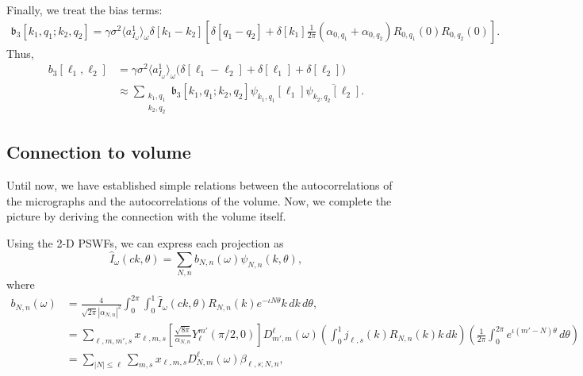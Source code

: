 \documentclass[12pt]{article}
\newcommand{\1}{\mathbf{1}}
\newcommand{\mk}{\mathfrak}
\newcommand*\Bell{\ensuremath{\boldsymbol\ell}}
\newcommand{\tamir}{x}
\theoremstyle{plain}
\theoremstyle{definition}
\theoremstyle{remark}
\theoremstyle{plain}
\theoremstyle{remark}
\theoremstyle{plain}
\theoremstyle{plain}
\begin{document}
Finally, we treat the bias terms:
\begin{align*}
\mk b_3[k_1,q_1; k_2,q_2] = \gamma\sigma^2\langle a^1_{I_{\omega}} \rangle_\omega \delta[k_1 - k_2]\left[\delta[q_1-q_2] + \delta[k_1]\frac{1}{2\pi}(\alpha_{0,q_1} + \alpha_{0,q_2})R_{0,q_1}(0)R_{0,q_2}(0)\right].
\end{align*}
%
Thus,
\begin{align*}
b_3[\Bell_1, \Bell_2] & = \gamma\sigma^2\langle a^1_{I_{\omega}}\rangle_{\omega}\Big(\delta[\Bell_1 - \Bell_2] +
\delta[\Bell_1] + \delta[\Bell_2]\Big) \\
& \approx \sum_{\substack{k_1, q_1\\ k_2, q_2}} \mk 
b_3[k_1,q_1; k_2, q_2]\psi_{k_1,q_1}[\Bell_1]\overline{\psi_{k_2,q_2}[\Bell_2]}.
\end{align*}

\subsection{Connection to volume}

Until now, we have established simple relations between the autocorrelations of the micrographs and the autocorrelations of the volume. Now, we complete the picture by deriving the connection with the volume itself.

Using the 2-D PSWFs, we can express each projection as 
\[ \widehat I_{\omega}(ck,\theta) = \sum_{N,n}b_{N,n}(\omega)\psi_{N,n}(k,\theta),\]
where
\begin{align*}
 b_{N,n}(\omega) &= \frac{4}{\sqrt{2\pi}|\alpha_{N,n}|^2}\int_0^{2\pi}\int_0^1\widehat I_{\omega}(ck,\theta)R_{N,n}(k)e^{-\iota N\theta}k\, dk\, d\theta,\\
&=\sum_{\ell,m,m',s}\tamir_{\ell,m,s}\left[\frac{\sqrt{8\pi}}{\alpha_{N,n}}Y_{\ell}^{m'}(\pi/2,0)\right]D_{m',m}^{\ell}(\omega) \left(\int_0^1j_{\ell,s}(k)R_{N,n}(k)k\, dk\right)\left(\frac{1}{2\pi}\int_0^{2\pi}e^{\iota(m'-N)\theta}\, d\theta\right)\\
&= \sum_{\vert N\vert\leq \ell}\sum_{m,s}\tamir_{\ell,m,s}D_{N,m}^{\ell}(\omega)\beta_{\ell,s;N,n},
\end{align*}
 
\end{document}
